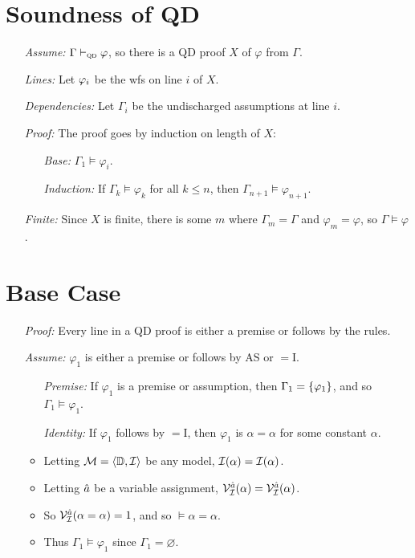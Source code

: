 \documentclass[a4paper, 11pt]{article} %
\begin{document}
\section*{Soundness of QD}

\begin{enumerate}
  \item[\it Assume:] $\Gamma \vdash_{\textsc{qd}} \varphi$, so there is a QD proof $X$ of $\varphi$ from $\Gamma$. 
  \item[\it Lines:] Let $\varphi_i$ be the wfs on line $i$ of $X$.
  \item[\it Dependencies:] Let $\Gamma_i$ be the undischarged assumptions at line $i$. 
  \item[\it Proof:] The proof goes by induction on length of $X$:
    \begin{itemize}
      \item[\it Base:] $\Gamma_1 \vDash \varphi_i$. 
      \item[\it Induction:] If $\Gamma_k \vDash \varphi_k$ for all $k\leq n$, then $\Gamma_{n+1} \vDash \varphi_{n+1}$. 
    \end{itemize}
  \item[\it Finite:] Since $X$ is finite, there is some $m$ where $\Gamma_m=\Gamma$ and $\varphi_m=\varphi$, so $\Gamma \vDash \varphi$.
\end{enumerate}




\section*{Base Case}

\begin{enumerate}
  \item[\it Proof:] Every line in a QD proof is either a premise or follows by the rules.
  \item[\it Assume:] $\varphi_1$ is either a premise or follows by AS or $=$I. 
    \begin{itemize}
      \item[\it Premise:] If $\varphi_1$ is a premise or assumption, then $\Gamma_1=\lbrace\varphi_1\rbrace$, and so $\Gamma_1\vDash\varphi_1$.
      \item[\it Identity:] If $\varphi_1$ follows by $=$I, then $\varphi_1$ is $\alpha=\alpha$ for some constant $\alpha$. 
      \item Letting $\mathcal{M}=\langle\mathbb{D},\mathcal{I}\rangle$ be any model, $\mathcal{I}(\alpha)=\mathcal{I}(\alpha)$.
      \item Letting $\hat{a}$ be a variable assignment, $\mathcal{V}_{\mathcal{I}}^{\hat{a}}(\alpha)=\mathcal{V}_{\mathcal{I}}^{\hat{a}}(\alpha)$.
      \item So $\mathcal{V}_{\mathcal{I}}^{\hat{a}}(\alpha=\alpha)=1$, and so $\vDash \alpha=\alpha$.
      \item Thus $\Gamma_1\vDash \varphi_1$ since $\Gamma_1=\varnothing$.
    \end{itemize}

\end{enumerate}
\end{document}
